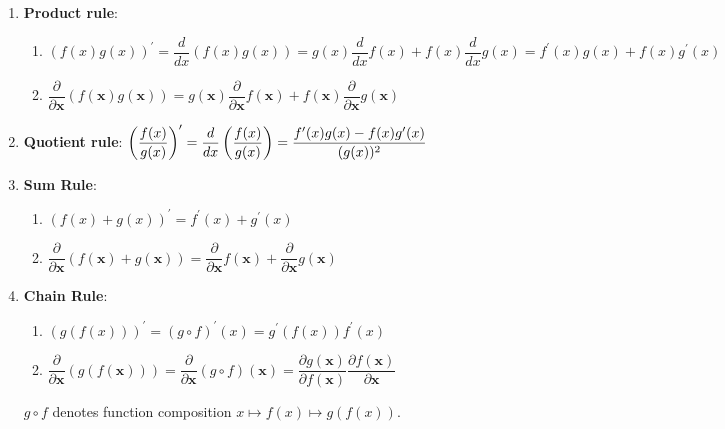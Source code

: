 \begin{enumerate}[series=vcalrules]
    \item \textbf{Product rule}: 
    \begin{enumerate}
        \item $
            (f(x)g(x))^\prime
            = \dfrac{d}{dx}(f(x)g(x))
            = g(x)\dfrac{d}{dx}f(x) + f(x)\dfrac{d}{dx}g(x)
            = f^\prime(x)g(x) + f(x)g^\prime(x)
        $
        \hfill \cite{mfml/book/mml/Deisenroth-Faisal-Ong}

        \item $
            \dfrac{\partial}{\partial \bm{x}}(f(\bm{x})g(\bm{x}))
            = g(\bm{x})\dfrac{\partial}{\partial \bm{x}}f(\bm{x}) 
                + f(\bm{x})\dfrac{\partial}{\partial \bm{x}}g(\bm{x})
        $ \hfill \cite{mfml/book/mml/Deisenroth-Faisal-Ong}
    \end{enumerate}

    \item \textbf{Quotient rule}:
    $
        \left(\dfrac{f(x)}{g(x)}\right)^\prime
        = \dfrac{d}{dx}\left(\dfrac{f(x)}{g(x)}\right)
        = \dfrac{f^\prime(x)g(x) - f(x)g^\prime(x)}{(g(x))^2}
    $
    \hfill \cite{mfml/book/mml/Deisenroth-Faisal-Ong}

    \item \textbf{Sum Rule}:
    \begin{enumerate}
        \item $
            (f(x) + g(x))^\prime
            = f^\prime(x) + g^\prime(x)
        $
        \hfill \cite{mfml/book/mml/Deisenroth-Faisal-Ong}

        \item $
            \dfrac{\partial}{\partial \bm{x}}(f(\bm{x}) + g(\bm{x}))
            = \dfrac{\partial}{\partial \bm{x}}f(\bm{x}) 
                + \dfrac{\partial}{\partial \bm{x}}g(\bm{x})
        $
        \hfill \cite{mfml/book/mml/Deisenroth-Faisal-Ong}
    \end{enumerate}

    \item \textbf{Chain Rule}: 
    \begin{enumerate}
        \item $
            (g(f(x)))^\prime
            = (g \circ f)^\prime(x)
            = g^\prime(f(x)) f^\prime(x)
        $
        \hfill \cite{mfml/book/mml/Deisenroth-Faisal-Ong}

        \item $
            \dfrac{\partial}{\partial \bm{x}}(g(f(\bm{x})))
            = \dfrac{\partial}{\partial \bm{x}}(g \circ f)(\bm{x})
            = \dfrac{\partial g(\bm{x})}{\partial f(\bm{x})}
                \dfrac{\partial f(\bm{x})}{\partial \bm{x}}
        $
        \hfill \cite{mfml/book/mml/Deisenroth-Faisal-Ong}
    \end{enumerate}
    $g \circ f$ denotes function composition $x \mapsto f (x) \mapsto g(f (x))$.
    \hfill \cite{mfml/book/mml/Deisenroth-Faisal-Ong}
\end{enumerate}

